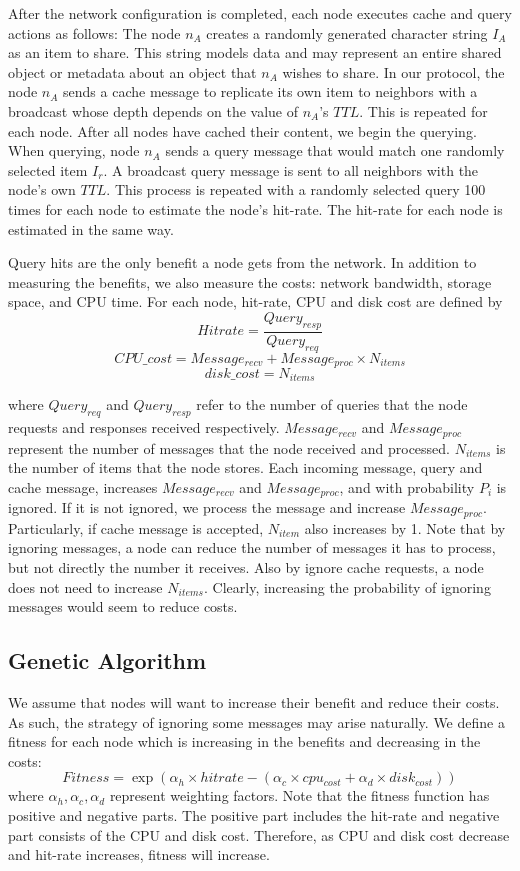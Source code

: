 \documentclass[12pt,journal,draftcls,letterpaper,onecolumn]{IEEEtran}
\begin{document}
After the network configuration is completed, each node executes cache and query actions as
follows: The node $n_A$ creates a randomly generated
character string $I_A$ as an item to share.
This string models data and may represent an entire shared object or metadata about an object
that $n_A$ wishes to share.
In our protocol, the node $n_A$ sends a cache message to replicate its own
item to neighbors with a broadcast whose depth depends on the value of $n_A$'s
$TTL$.  This is repeated for each node.  After all nodes have cached their
content, we begin the querying.  When querying, node $n_A$ sends a query
message that would match one randomly selected item $I_r$.  A broadcast query
message is sent to all neighbors with the node's own $TTL$.  This process is
repeated with a randomly selected query 100 times for each node to estimate
the node's hit-rate. The hit-rate for each node is estimated in the same way.

Query hits are the only benefit a node gets from the network.  In addition to
measuring the benefits, we also measure the costs: network bandwidth,
storage space, and CPU time.
For each node, hit-rate, CPU and disk cost are defined by
\[
Hitrate=\frac{Query_{resp}}{Query_{req}}
\]
\[
CPU\_cost=Message_{recv}+Message_{proc} \times N_{items}
\]
\[
disk\_cost=N_{items}
\]

where $Query_{req}$ and $Query_{resp}$ refer to the number of queries that 
the node requests and responses received respectively. $Message_{recv}$ and $Message_{proc}$ 
represent the number of messages that the node received and processed. 
$N_{items}$ is the number of items that the node stores.  Each incoming message, 
query and cache message, increases $Message_{recv}$ and $Message_{proc}$, 
and with probability $P_i$ is ignored.  If it is not ignored, we process the message 
and increase $Message_{proc}$.  Particularly, if cache message is accepted, 
$N_{item}$ also increases by 1. Note that by ignoring messages, a node can reduce 
the number of messages it has to process, but not directly the number it receives.  Also by ignore cache
requests, a node does not need to increase $N_{items}$.  Clearly, increasing
the probability of ignoring messages would seem to reduce costs.

\subsection{Genetic Algorithm}\label{sec:genetic}
We assume that nodes will want to increase their benefit and reduce their
costs.  As such, the strategy of ignoring some messages may 
arise naturally.  We define a fitness for each node which is increasing in the
benefits and decreasing in the costs:
\[
Fitness = \exp\left(\alpha_{h}\times hitrate-(\alpha_{c}\times cpu_{cost} +
\alpha_{d}\times disk_{cost})\right)
\] where $\alpha_h, \alpha_c, \alpha_d$ represent weighting factors.
Note that the fitness function has positive and
negative parts.
The positive part includes the hit-rate and negative part consists of the CPU and disk
cost. Therefore, as CPU and disk cost decrease and hit-rate increases, fitness will increase.
\end{document}
